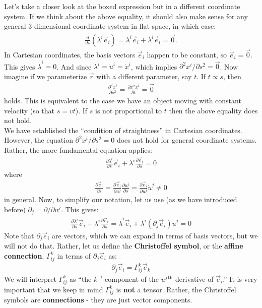 \documentclass{article}
\theoremstyle{definition}
\begin{document}
Let's take a closer look at the boxed expression but in a different coordinate system. If we think about the above equality, it should also make sense for any general 3-dimensional coordinate system in flat space, in which case:
\begin{align*}
\frac{d}{ds}\left(\lambda^i \vec{e}_i \right) = \dot{\lambda^i}\vec{e}_i + \lambda^i\dot{\vec{e}}_i  =  \vec{0}. 
\end{align*}
In Cartesian coordinates, the basis vectors $\vec{e}_i$ happen to be constant, so $\dot{\vec{e}}_i = \vec{0}$. This gives $\dot{\lambda}^i = 0$. And since $\lambda^i = \dot{u}^i = \dot{x}^i$, which implies $\partial^2 x^i/\partial s^2 = \vec{0}$. Now imagine if we parameterize $\vec{r}$ with a different parameter, say $t$. If $t \propto s$, then
\begin{align*}
\frac{\partial^2 x^i}{\partial s^2} = \frac{\partial x^2 x^i}{\partial t} = \vec{0}
\end{align*}
holds. This is equivalent to the case we have an object moving with constant velocity (so that $s = vt$). If $s$ is not proportional to $t$ then the above equality does not hold.\\

We have established the ``condition of straightness'' in Cartesian coordinates. However, the equation $\partial^2 x^i/\partial s^2 = 0$ does not hold for general coordinate systems. Rather, the more fundamental equation applies:
\begin{align*}
\boxed{\frac{\partial \lambda^i}{\partial s}\vec{e}_i + \lambda^i\frac{\partial \vec{e}_i}{\partial s} = 0}
\end{align*}
where 
\begin{align*}
\frac{\partial \vec{e}_i}{\partial s} = \frac{\partial \vec{e}_i}{\partial u^j}\frac{\partial u^j}{\partial s}  = \frac{\partial \vec{e}_i}{\partial u^j}\dot{u}^j \neq 0
\end{align*}
in general. Now, to simplify our notation, let us use (as we have introduced before) $\partial_j = \partial/\partial u^j$. This gives:
\begin{align*}
\frac{\partial \lambda^i}{\partial s}\vec{e}_i + \lambda^i\frac{\partial \vec{e}_i}{\partial s} 
=  \dot{\lambda}^i\vec{e}_i + \lambda^i\left( \partial_j \vec{e}_i\right)\dot{u}^j 
=0
\end{align*} 
Note that $\partial_j\vec{e}_i$ are vectors, which we can expand in terms of basis vectors, but we will not do that. Rather, let us define the \textbf{Christoffel symbol}, or the \textbf{affine connection}, $\Gamma^{k}_{ij}$ in terms of $\partial_j\vec{e}_i$ as:
\begin{align*}
\boxed{\partial_j\vec{e}_i = \Gamma^{k}_{ij}\vec{e}_k}
\end{align*}
We will interpret $\Gamma^{k}_{ij}$ as ``the $k^{\text{th}}$ component of the $u^{j\,\text{th}}$ derivative of $\vec{e}_i$.'' It is very important that we keep in mind $\Gamma^{k}_{ij}$ is \textbf{not} a tensor. Rather, the Christoffel symbols are \textbf{connections} - they are just vector components.\\
\end{document}
